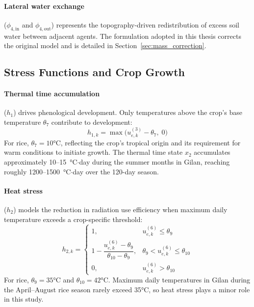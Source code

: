 \paragraph{Lateral water exchange} ($\phi_{4,\text{in}}$ and $\phi_{4,\text{out}}$) represents the topography-driven redistribution of excess soil water between adjacent agents. The formulation adopted in this thesis corrects the original model and is detailed in Section~\ref{sec:mass_correction}.


\subsection{Stress Functions and Crop Growth}
\label{sec:stress_growth}

\paragraph{Thermal time accumulation} ($h_1$) drives phenological development. Only temperatures above the crop's base temperature $\theta_7$ contribute to development:
\begin{equation}
    h_{1,k} = \max\!\bigl(u_{e,k}^{(3)} - \theta_7,\; 0\bigr)
    \label{eq:h1}
\end{equation}
For rice, $\theta_7 = 10$°C, reflecting the crop's tropical origin and its requirement for warm conditions to initiate growth. The thermal time state $x_2$ accumulates approximately 10--15~°C$\cdot$day during the summer months in Gilan, reaching roughly 1200--1500~°C$\cdot$day over the 120-day season.

\paragraph{Heat stress} ($h_2$) models the reduction in radiation use efficiency when maximum daily temperature exceeds a crop-specific threshold:
\begin{equation}
    h_{2,k} = 
    \begin{cases}
        1, & u_{e,k}^{(6)} \leq \theta_9 \\[4pt]
        1 - \dfrac{u_{e,k}^{(6)} - \theta_9}{\theta_{10} - \theta_9}, & \theta_9 < u_{e,k}^{(6)} \leq \theta_{10} \\[8pt]
        0, & u_{e,k}^{(6)} > \theta_{10}
    \end{cases}
    \label{eq:h2}
\end{equation}
For rice, $\theta_9 = 35$°C and $\theta_{10} = 42$°C. Maximum daily temperatures in Gilan during the April--August rice season rarely exceed 35°C, so heat stress plays a minor role in this study.

